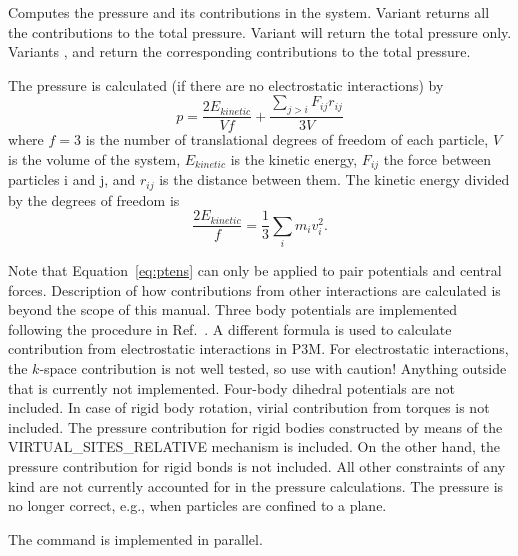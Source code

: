 Computes the pressure and its contributions in the system. Variant
 returns all the contributions to the total pressure.
Variant  will return the total pressure only.  Variants
,  and  return the corresponding
contributions to the total pressure.



The pressure is calculated (if there are no electrostatic interactions) by 
\begin{equation}
\label{eq:ptens}
  p = \frac{2E_{kinetic}}{Vf} + \frac{\sum_{j>i} {F_{ij}r_{ij}}}{3V}
\end{equation}
where $f=3$ is the number of translational degrees of freedom of each particle, $V$
is the volume of the system, $E_{kinetic}$ is the kinetic energy, $F_{ij}$ the force between
particles i and j, and $r_{ij}$ is the distance between them.  The kinetic energy divided by the
degrees of freedom is
\begin{equation}
\frac{2E_{kinetic}}{f} = \frac{1}{3}\sum_{i} {m_{i}v_{i}^{2}}.
\end {equation}

Note that Equation~\ref{eq:ptens} can only be applied to pair potentials and central forces.
Description of how contributions from other interactions are calculated is beyond the scope
of this manual. Three body potentials are implemented following the procedure in 
Ref.~\cite{thompson09a}.
A different formula is used to calculate contribution from electrostatic interactions 
in P3M. For electrostatic interactions, the $k$-space contribution is not 
well tested, so use with caution!
Anything outside that is currently not implemented.
Four-body dihedral potentials are not included.
In case of rigid body rotation, virial contribution from torques is not included.
The pressure contribution for rigid bodies constructed by means of the VIRTUAL\_SITES\_RELATIVE mechanism is included. On the other hand, the pressure contribution for rigid bonds is not included.
All other constraints of any kind are not currently accounted for in the pressure calculations. 
The pressure is no longer correct, e.g., when particles are confined to a plane.

The command is implemented in parallel.

